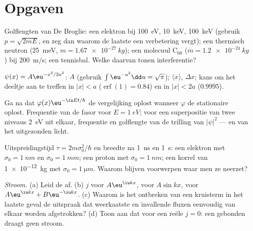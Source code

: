 \section{Opgaven}

\begin{exercise}[$\star$]\label{exo:b2:schrodinger-wave-functions:1}
Golflengten van De Broglie: een elektron bij \qty{100}{eV}, \qty{10}{keV},
\qty{100}{keV} (gebruik $p = \sqrt{2mE}$, en zeg dan waarom de laatste een
verbetering vergt); een thermisch neutron (\qty{25}{meV},
$m = \qty{1.67e-27}{kg}$); een
molecuul C$_{60}$ ($m = \qty{1.2e-24}{kg}$) bij \qty{200}{m/s}; een tennisbal.
Welke daarvan tonen interferentie?
\end{exercise}

\begin{exercise}[$\star$]\label{exo:b2:schrodinger-wave-functions:2}
$\psi(x) = A\eu^{-x^2/2a^2}$: $A$ (gebruik $\int\eu^{-u^2}\dd u = \sqrt\pi$);
$\langle x\rangle$, $\Delta x$; kans om het deeltje aan te treffen in
$|x| < a$ ($\operatorname{erf}(1) = 0.84$) en in $|x| < 2a$ ($0.9995$).
\end{exercise}

\begin{exercise}[$\star$]\label{exo:b2:schrodinger-wave-functions:3}
Ga na dat $\varphi(x)\eu^{-\iu Et/\hbar}$ de vergelijking oplost wanneer $\varphi$
de stationaire oplost. Frequentie van de fasor voor $E = \qty{1}{eV}$;
voor een superpositie van twee niveaus \qty{2}{eV} uit elkaar, frequentie en
golflengte van de trilling van $|\psi|^2$ --- en van het uitgezonden
licht.
\end{exercise}

\begin{exercise}[$\star$]\label{exo:b2:schrodinger-wave-functions:4}
Uitspreidingstijd $\tau = 2m\sigma_0^2/\hbar$ en breedte na \qty{1}{ns} en
\qty{1}{s}: een elektron met $\sigma_0 = \qty{1}{nm}$ en $\sigma_0 = \qty{1}{mm}$;
een proton met $\sigma_0 = \qty{1}{nm}$; een korrel van \qty{1e-12}{kg} met
$\sigma_0 = \qty{1}{\micro m}$. Waarom blijven voorwerpen waar men ze neerzet?
\end{exercise}

\begin{exercise}[$\star\star$]\label{exo:b2:schrodinger-wave-functions:5}
\emph{Stroom.} (a) Leid de  af. (b) $j$ voor
$A\eu^{\iu kx}$, voor $A\sin kx$, voor $A\eu^{\iu kx} + B\eu^{-\iu kx}$. (c)
Waarom is
het ontbreken van een kruisterm in het laatste geval de uitspraak dat
weerkaatste en invallende fluxen eenvoudig van elkaar worden afgetrokken?
(d) Toon aan dat voor een reële
 $j = 0$: een gebonden  draagt geen stroom.
\end{exercise}

